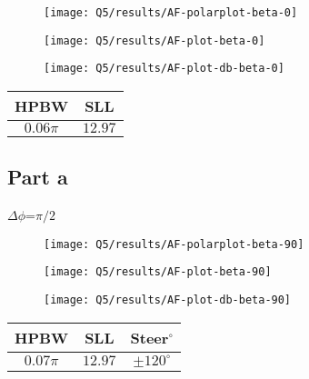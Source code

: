 \documentclass[12pt,onecolumn,a4paper]{article}
\begin{document}
\begin{figure}[H]
	\centering
	\texttt{[image: Q5/results/AF-polarplot-beta-0]}
	\caption{}
	\label{fig:af-polarplot-beta-0}
\end{figure}

\begin{figure}[H] 
	\centering
	\texttt{[image: Q5/results/AF-plot-beta-0]}
	\caption{}
	\label{fig:af-plot-beta-0}
\end{figure}

\begin{figure}[H] 
	\centering
	\texttt{[image: Q5/results/AF-plot-db-beta-0]}
	\caption{}
	\label{fig:af-plot-db-beta-0}
\end{figure}


\begin{table}[H]
	\centering
	\begin{tabular}{cc}
		\toprule
		\textbf{HPBW} & \textbf{SLL} \\
		\midrule
		$0.06 \pi$ & $12.97$ \\
		\bottomrule
	\end{tabular}
\end{table}




\subsection{Part a}
{\color{questioncolor} $\Delta\phi$=$\pi/2$
}

\begin{figure}[H]
	\centering
	\texttt{[image: Q5/results/AF-polarplot-beta-90]}
	\caption{}
	\label{fig:af-polarplot-beta-90}
\end{figure}

\begin{figure}[H] 
	\centering
	\texttt{[image: Q5/results/AF-plot-beta-90]}
	\caption{}
	\label{fig:af-plot-beta-90}
\end{figure}

\begin{figure}[H] 
	\centering
	\texttt{[image: Q5/results/AF-plot-db-beta-90]}
	\caption{}
	\label{fig:af-plot-db-beta-90}
\end{figure}


\begin{table}[H]
	\centering
	\begin{tabular}{ccc}
		\toprule
		\textbf{HPBW} & \textbf{SLL} & \textbf{Steer$^\circ$}\\
		\midrule
		$0.07 \pi$ & $12.97$ & $\pm 120^\circ$\\
		\bottomrule
	\end{tabular}
\end{table}
\end{document}
